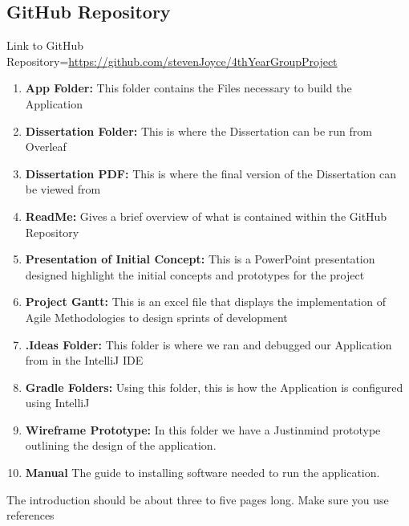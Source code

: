 \subsection{GitHub Repository}
Link to GitHub Repository={\url{https://github.com/stevenJoyce/4thYearGroupProject}}
\newline
\begin{enumerate}
    \item \textbf{App Folder:} 
    \newline This folder contains the Files necessary to build the Application
    \item \textbf{Dissertation Folder:}
    \newline This is where the Dissertation can be run from Overleaf 
    \item \textbf{Dissertation PDF:}
    \newline This is where the final version of the Dissertation can be viewed from
    \item \textbf{ReadMe:}
    \newline Gives a brief overview of what is contained within the GitHub Repository
    \item \textbf{Presentation of Initial Concept:}
    \newline This is a PowerPoint presentation designed highlight the initial concepts and prototypes for the project
    \item \textbf{Project Gantt:}
    \newline This is an excel file that displays the implementation of Agile Methodologies to design sprints of development
    \item \textbf{.Ideas Folder:}
    \newline This folder is where we ran and debugged our Application from in the IntelliJ IDE
    \item \textbf{Gradle Folders:}
    \newline Using this folder, this is how the Application is configured using IntelliJ
    \item \textbf{Wireframe Prototype:}
    \newline In this folder we have a Justinmind prototype outlining the design of the application.
    \item \textbf{Manual}
    \newline The guide to installing software needed to run the application.
\end{enumerate}


The introduction should be about three to five pages long.
Make sure you use references

